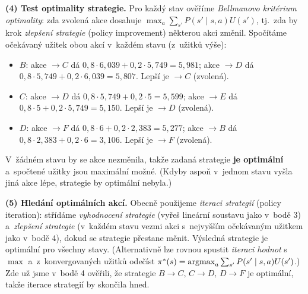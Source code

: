 \begin{priklad}
\textbf{(4) Test optimality strategie.} Pro každý stav ověříme \emph{Bellmanovo kritérium optimality}: zda zvolená akce dosahuje $\max_{a}\sum_{s'}P(s'\mid s,a)U(s')$, tj.\ zda by krok \emph{zlepšení strategie} (policy improvement) některou akci změnil. Spočítáme očekávaný užitek obou akcí v~každém stavu (z~užitků výše):
\begin{itemize}
  \item $B$: akce $\to C$ dá $0{,}8\cdot 6{,}039 + 0{,}2\cdot 5{,}749 = 5{,}981$; akce $\to D$ dá $0{,}8\cdot 5{,}749 + 0{,}2\cdot 6{,}039 = 5{,}807$. Lepší je $\to C$ (zvolená).
  \item $C$: akce $\to D$ dá $0{,}8\cdot 5{,}749 + 0{,}2\cdot 5 = 5{,}599$; akce $\to E$ dá $0{,}8\cdot 5 + 0{,}2\cdot 5{,}749 = 5{,}150$. Lepší je $\to D$ (zvolená).
  \item $D$: akce $\to F$ dá $0{,}8\cdot 6 + 0{,}2\cdot 2{,}383 = 5{,}277$; akce $\to B$ dá $0{,}8\cdot 2{,}383 + 0{,}2\cdot 6 = 3{,}106$. Lepší je $\to F$ (zvolená).
\end{itemize}
V~žádném stavu by se akce nezměnila, takže zadaná strategie \textbf{je optimální} a~spočtené užitky jsou maximální možné. (Kdyby aspoň v~jednom stavu vyšla jiná akce lépe, strategie by optimální nebyla.)

\textbf{(5) Hledání optimálních akcí.} Obecně použijeme \emph{iteraci strategií} (policy iteration): střídáme \emph{vyhodnocení strategie} (vyřeš lineární soustavu jako v~bodě 3) a~\emph{zlepšení strategie} (v~každém stavu vezmi akci s~nejvyšším očekávaným užitkem jako v~bodě 4), dokud se strategie přestane měnit. Výsledná strategie je optimální pro všechny stavy. (Alternativně lze rovnou spustit \emph{iteraci hodnot} s~$\max$ a~z~konvergovaných užitků odečíst $\pi^\ast(s)=\operatorname*{argmax}_a\sum_{s'}P(s'\mid s,a)U(s')$.) Zde už jsme v~bodě 4 ověřili, že strategie $B\to C,\,C\to D,\,D\to F$ je optimální, takže iterace strategií by skončila hned.


\end{priklad}
